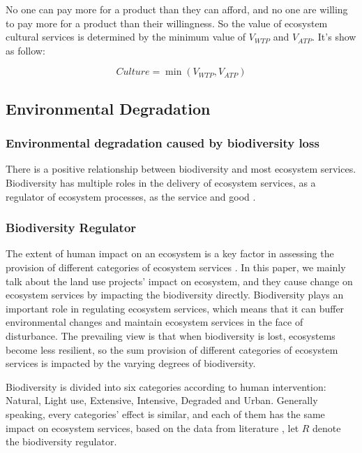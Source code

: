 \documentclass{mcmthesis}
\begin{document}
				No one can pay more for a product than they can afford, and no one are willing to pay more for a product than their willingness. So the value of ecosystem cultural services is determined by the minimum value of $V_{WTP}$ and $V_{ATP}$. It’s show as follow:
				
				\begin{equation}
					Culture = \min \left( V _ { W T P } , V _ { A T P } \right)
				\end{equation}
				
				
		\subsection{Environmental Degradation}
		
			\subsubsection{Environmental degradation caused by biodiversity loss}
			
				There is a positive relationship between biodiversity and most ecosystem services. Biodiversity has multiple roles in the delivery of ecosystem services, as a regulator of ecosystem processes, as the service and good \cite{mace2012biodiversity}.
	

				
				\subsubsection{Biodiversity Regulator}
				
					The extent of human impact on an ecosystem is a key factor in assessing the provision of different categories of ecosystem services \cite{cimon2013fostering}. In this paper, we mainly talk about the land use projects' impact on ecosystem, and they cause change on ecosystem services by impacting the biodiversity directly. \cite{de2010challenges} Biodiversity plays an important role in regulating ecosystem services, which means that it can buffer environmental changes and maintain ecosystem services in the face of disturbance. The prevailing view is that when biodiversity is lost, ecosystems become less resilient, so the sum provision of different categories of ecosystem services is impacted by the varying degrees of biodiversity.
					
					
					Biodiversity is divided into six categories according to human intervention: Natural, Light use, Extensive, Intensive, Degraded and Urban. Generally speaking, every categories’ effect is similar, and each of them has the same impact on ecosystem services, based on the data from literature \cite{de2010challenges}, let $R$ denote the biodiversity regulator.
					
\end{document}
